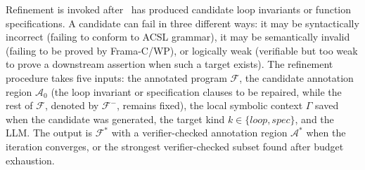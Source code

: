 \DIFaddbegin
Refinement is invoked after \toolname\ has produced candidate loop invariants or function specifications. A candidate can fail in three different ways: it may be syntactically incorrect (failing to conform to ACSL grammar), it may be semantically invalid (failing to be proved by Frama-C/WP), or logically weak (verifiable but too weak to prove a downstream assertion when such a target exists). The refinement procedure takes five inputs: the annotated program $\mathcal{F}$, the candidate annotation region $\mathcal{A}_{0}$ (the loop invariant or specification clauses to be repaired, while the rest of $\mathcal{F}$, denoted by $\mathcal{F}^{-}$, remains fixed), the local symbolic context $\Gamma$ saved when the candidate was generated, the target kind $k \in \{\textit{loop},\textit{spec}\}$, and the LLM. The output is $\mathcal{F}^*$ with a verifier-checked annotation region $\mathcal{A}^*$ when the iteration converges, or the strongest verifier-checked subset found after budget exhaustion. 
\DIFaddend

